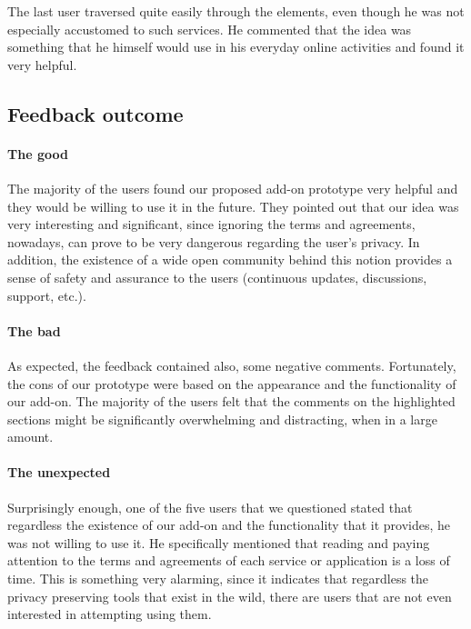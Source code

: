 The last user traversed quite easily through the elements, even though he was 
not especially accustomed to such services. He commented that the idea was 
something that he himself would use in his everyday online activities and found 
it very helpful.

\subsection{Feedback outcome}

\paragraph{The good}

The majority of the users found our proposed add-on prototype very helpful and 
they would be willing to use it in the future. They pointed out that our idea 
was very interesting and significant, since ignoring the terms and agreements, 
nowadays, can prove to be very dangerous regarding the user's privacy. In 
addition, the existence of a wide open community behind this notion provides a 
sense of safety and assurance to the users (continuous updates, discussions, 
support, etc.). 

\paragraph{The bad}

As expected, the feedback contained also, some negative comments. Fortunately, 
the cons of our prototype were based on the appearance and the functionality of 
our add-on. The majority of the users felt that the comments on the highlighted 
sections might be significantly overwhelming and distracting, when in a large 
amount. 

\paragraph{The unexpected}

Surprisingly enough, one of the five users that we questioned stated that 
regardless the existence of our add-on and the functionality that it provides, 
he was not willing to use it. 
He specifically mentioned that reading and paying attention to the terms and 
agreements of each service or application is a loss of time. This is something 
very alarming, since it indicates that regardless the privacy preserving tools 
that exist in the wild, there are users that are not even interested in 
attempting using them.

